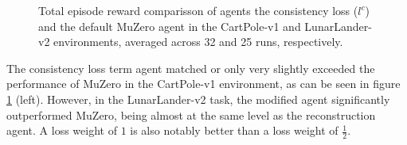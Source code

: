 \begin{figure}[ht]
    \caption{Total episode reward comparisson of agents the consistency loss ($l^c$) and the default MuZero agent in the CartPole-v1 and LunarLander-v2 environments, averaged across 32 and 25 runs, respectively.}
    \label{fig:consistency_results}
\end{figure}
The consistency loss term agent matched or only very slightly exceeded the performance of MuZero in the CartPole-v1 environment, as can be seen in figure \ref{fig:consistency_results} (left). However, in the LunarLander-v2 task, the modified agent significantly outperformed MuZero, being almost at the same level as the reconstruction agent. A loss weight of $1$ is also notably better than a loss weight of $\frac{1}{2}$.

